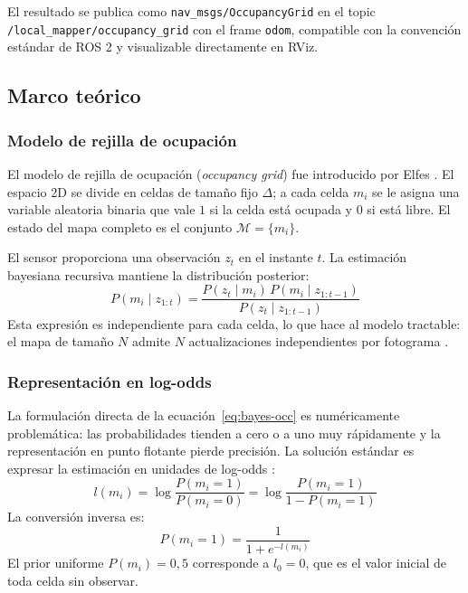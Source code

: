 El resultado se publica como \texttt{nav\_msgs/OccupancyGrid} en el topic
\texttt{/local\_mapper/occupancy\_grid} con el frame \texttt{odom},
compatible con la convención estándar de ROS 2 y visualizable directamente
en RViz.

\subsection{Marco teórico}
\label{subsec:lm-v5-teoria}

\subsubsection{Modelo de rejilla de ocupación}
\label{subsubsec:lm-v5-elfes}

El modelo de rejilla de ocupación (\emph{occupancy grid}) fue introducido por
Elfes \cite{Elfes1989}. El espacio 2D se divide en celdas de tamaño fijo
$\Delta$; a cada celda $m_i$ se le asigna una variable aleatoria binaria que
vale $1$ si la celda está ocupada y $0$ si está libre. El estado del mapa
completo es el conjunto $\mathcal{M} = \{m_i\}$.

El sensor proporciona una observación $z_t$ en el instante $t$. La estimación
bayesiana recursiva mantiene la distribución posterior:
%
\begin{equation}
  \label{eq:bayes-occ}
  P(m_i \mid z_{1:t}) =
  \frac{P(z_t \mid m_i)\,P(m_i \mid z_{1:t-1})}{P(z_t \mid z_{1:t-1})}
\end{equation}
%
Esta expresión es independiente para cada celda, lo que hace al modelo
tractable: el mapa de tamaño $N$ admite $N$ actualizaciones independientes por
fotograma \cite{Thrun2005}.

\subsubsection{Representación en log-odds}
\label{subsubsec:lm-v5-logodds}

La formulación directa de la ecuación~\ref{eq:bayes-occ} es numéricamente
problemática: las probabilidades tienden a cero o a uno muy rápidamente y
la representación en punto flotante pierde precisión. La solución estándar es
expresar la estimación en unidades de log-odds \cite{Thrun2005}:
%
\begin{equation}
  \label{eq:logodds-def}
  l(m_i) = \log \frac{P(m_i = 1)}{P(m_i = 0)} = \log \frac{P(m_i = 1)}{1 - P(m_i = 1)}
\end{equation}
%
La conversión inversa es:
%
\begin{equation}
  \label{eq:logodds-inv}
  P(m_i = 1) = \frac{1}{1 + e^{-l(m_i)}}
\end{equation}
%
El prior uniforme $P(m_i) = 0{,}5$ corresponde a $l_0 = 0$, que es el valor
inicial de toda celda sin observar.

